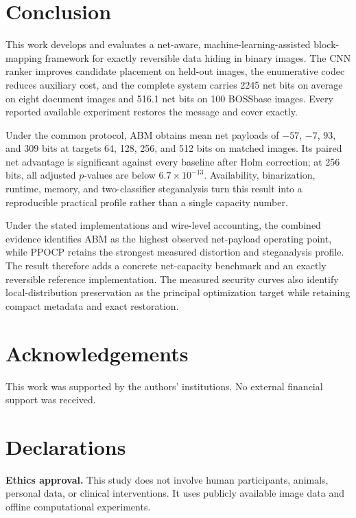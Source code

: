 \documentclass[a4paper,fleqn]{cas-dc}
\begin{document}
\section{Conclusion}
\label{sec:conclusion}

This work develops and evaluates a net-aware, machine-learning-assisted
block-mapping framework for exactly reversible data hiding in binary images.
The CNN ranker improves candidate placement on held-out images, the
enumerative codec reduces auxiliary cost, and the complete system carries 2245
net bits on average on eight document images and 516.1 net bits on 100
BOSSbase images. Every reported available experiment restores the message and
cover exactly.

Under the common protocol, ABM obtains mean net payloads of $-57$, $-7$, $93$,
and $309$ bits at targets 64, 128, 256, and 512 bits on matched images. Its
paired net advantage is significant against every baseline after Holm
correction; at 256 bits, all adjusted $p$-values are below
$6.7\times10^{-13}$. Availability, binarization, runtime, memory, and two-classifier
steganalysis turn this result into a reproducible practical profile rather than
a single capacity number.

Under the stated implementations and wire-level accounting, the combined
evidence identifies ABM as the highest observed net-payload operating point,
while PPOCP retains the strongest measured distortion and steganalysis
profile. The result therefore adds a concrete net-capacity benchmark and an
exactly reversible reference implementation. The measured security curves
also identify local-distribution preservation as the principal optimization
target while retaining compact metadata and exact restoration.

\section*{Acknowledgements}
This work was supported by the authors' institutions. No external financial
support was received.

\printcredits

\section*{Declarations}
\noindent\textbf{Ethics approval.}
This study does not involve human participants, animals, personal data, or
clinical interventions. It uses publicly available image data and offline
computational experiments.
\end{document}
